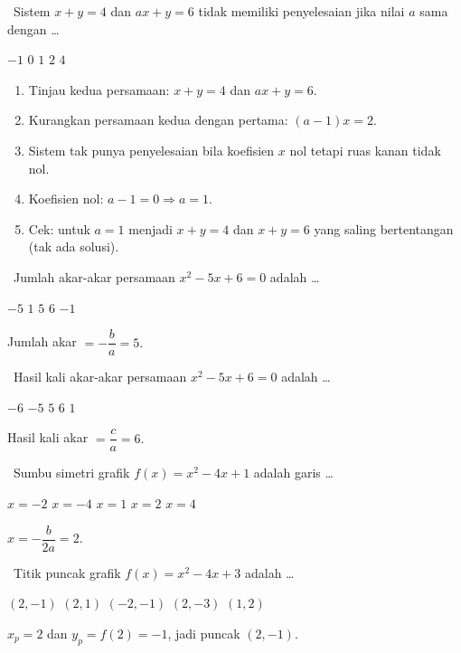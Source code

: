 \documentclass[11pt,a4paper]{exam}
\newenvironment{langkah}{%
  \begin{enumerate}[label=\textbf{Langkah \arabic*:},leftmargin=2.6em,
    itemsep=2pt,topsep=2pt]}{\end{enumerate}}
\newcommand{\Fund}{{\footnotesize\textsf{\textcolor{hijau}{[Fundamental]}}}\ }
\newcommand{\Inter}{{\footnotesize\textsf{\textcolor{biru}{[Intermediate]}}}\ }
\newcommand{\Exp}{{\footnotesize\textsf{\textcolor{ungu}{[Expert]}}}\ }
\newcommand{\topik}[1]{%
  \par\addvspace{14pt}%
  \noindent{\large\bfseries\color{biru}#1}\par\addvspace{6pt}}
\begin{document}
\begin{questions}
\question \Exp Sistem $x + y = 4$ dan $ax + y = 6$ tidak memiliki penyelesaian jika
nilai $a$ sama dengan \dots
\begin{choices}
\choice $-1$ \choice $0$ \CorrectChoice $1$ \choice $2$ \choice $4$
\end{choices}
\begin{solution}
\begin{langkah}
\item Tinjau kedua persamaan: $x+y=4$ dan $ax+y=6$.
\item Kurangkan persamaan kedua dengan pertama: $(a-1)x = 2$.
\item Sistem tak punya penyelesaian bila koefisien $x$ nol tetapi ruas kanan tidak nol.
\item Koefisien nol: $a-1 = 0 \Rightarrow a = 1$.
\item Cek: untuk $a=1$ menjadi $x+y=4$ dan $x+y=6$ yang saling bertentangan (tak ada solusi).
\end{langkah}
\end{solution}

\topik{6. Fungsi Kuadrat (8 Soal)}

\question \Fund Jumlah akar-akar persamaan $x^{2} - 5x + 6 = 0$ adalah \dots
\begin{choices}
\choice $-5$ \choice $1$ \CorrectChoice $5$ \choice $6$ \choice $-1$
\end{choices}
\begin{solution}Jumlah akar $= -\dfrac{b}{a} = 5.$\end{solution}

\question \Fund Hasil kali akar-akar persamaan $x^{2} - 5x + 6 = 0$ adalah \dots
\begin{choices}
\choice $-6$ \choice $-5$ \choice $5$ \CorrectChoice $6$ \choice $1$
\end{choices}
\begin{solution}Hasil kali akar $= \dfrac{c}{a} = 6.$\end{solution}

\question \Fund Sumbu simetri grafik $f(x) = x^{2} - 4x + 1$ adalah garis \dots
\begin{choices}
\choice $x = -2$ \choice $x = -4$ \choice $x = 1$ \CorrectChoice $x = 2$ \choice $x = 4$
\end{choices}
\begin{solution}$x = -\dfrac{b}{2a} = 2.$\end{solution}

\question \Inter Titik puncak grafik $f(x) = x^{2} - 4x + 3$ adalah \dots
\begin{choices}
\CorrectChoice $(2,-1)$ \choice $(2,1)$ \choice $(-2,-1)$ \choice $(2,-3)$ \choice $(1,2)$
\end{choices}
\begin{solution}$x_p = 2$ dan $y_p = f(2) = -1$, jadi puncak $(2,-1).$\end{solution}


\end{questions}
\end{document}
